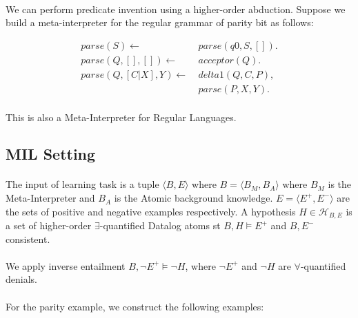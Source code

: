 \documentclass{article}
\theoremstyle{plain}
\theoremstyle{definition}
\begin{document}
\begin{multicols}{2}
\paragraph{} We can perform predicate invention using a higher-order abduction. Suppose we build a meta-interpreter for the regular grammar of parity bit as follows:

\begin{align*}
parse(S) \leftarrow\ &parse(q0, S, []).\\
parse(Q, [], []) \leftarrow\ &acceptor(Q).\\
parse(Q, [C|X], Y) \leftarrow\ &delta1(Q, C, P),\\ &parse(P, X, Y).
\end{align*}

\paragraph{} This is also a Meta-Interpreter for Regular Languages.

\subsection{MIL Setting}

\paragraph{} The input of learning task is a tuple $\langle B, E\rangle$ where $B = \langle B_M, B_A \rangle$ where $B_M$ is the Meta-Interpreter and $B_A$ is the Atomic background knowledge. $E = \langle E^+, E^- \rangle$ are the sets of positive and negative examples respectively. A hypothesis $H \in \mathcal{H}_{B,E}$ is a set of higher-order $\exists$-quantified Datalog atoms st $B, H \models E^+$ and $B, E^-$ consistent.

\paragraph{} We apply inverse entailment $B, \lnot E^+ \models \lnot H$, where $\lnot E^+$ and $\lnot H$ are $\forall$-quantified denials.

\paragraph{} For the parity example, we construct the following examples:

\begin{table}[H]
\centering\footnotesize
\begin{tabular}{ | l | l | l | }


\end{tabular}
\end{table}
\end{multicols}
\end{document}
